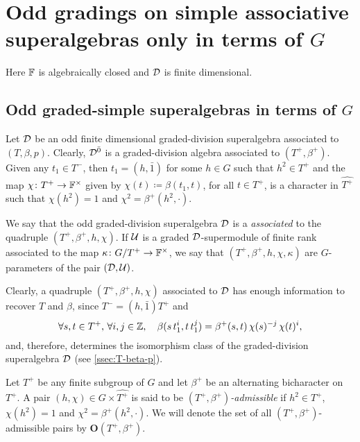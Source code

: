 \section{Odd gradings on simple associative superalgebras only in terms of \texorpdfstring{$G$}{G}}\label{sec:assc-only-G}

Here $\mathbb{F}$ is algebraically closed and $\mathcal{D}$ is finite dimensional.

\subsection{Odd graded-simple superalgebras in terms of $G$}\label{ssec:odd-div-G-only}

Let $\mathcal{D}$ be an odd finite dimensional graded-division superalgebra associated to $(T, \beta, p)$. 
Clearly, $\mathcal{D}^{\bar0}$ is a graded-division algebra associated to $(T^+, \beta^+)$. 
Given any $t_1 \in T^-$, then $t_1 = (h, \bar 1)$ for some $h\in G$ such that $h^2\in T^+$ and the map $\chi \colon T^+ \to \mathbb{F}^\times$ given by $\chi(t) \coloneqq \beta(t_1, t)$, for all $t\in T^+$, is a character in $\widehat{T^+}$ such that $\chi(h^2) = 1$ and $\chi^2 = \beta^+ (h^2, \cdot)$. 

\begin{defi}\label{def:O(T+-beta+)}
    We say that the odd graded-division superalgebra $\mathcal{D}$ is a \emph{associated} to the quadruple $(T^+, \beta^+, h,\chi)$. 
    If $\mathcal U$ is a graded $\mathcal{D}$-supermodule of finite rank associated to the map $\kappa\colon G/T^+ \to \mathbb{F}^\times$, we say that $(T^+, \beta^+, h, \chi, \kappa)$ are $G$-parameters of the pair $(\mathcal{D}, \mathcal U)$. 
\end{defi}

Clearly, a quadruple $(T^+, \beta^+, h,\chi)$ associated to $\mathcal{D}$ has enough information to recover $T$ and $\beta$, since $T^- = (h, \bar 1) T^+$ and
\[\label{eq:beta-from-h-chi}
    \forall s,t\in T^+,\, \forall i,j \in \mathbb{Z}, \quad \beta(s\, t_1^i,t \, t_1^j) = \beta^+(s,t)\, \chi (s)^{-j}\, \chi (t)^i,
\]
and, therefore, determines the isomorphism class of the graded-division superalgebra $\mathcal{D}$ (see \cref{ssec:T-beta-p}). 

\begin{defi}\label{def:odd-parameters}
    Let $T^+$ be any finite subgroup of $G$ and let $\beta^+$ be an alternating bicharacter on $T^+$. 
    A pair $(h,\chi) \in G \times \widehat{T^+}$ is said to be \emph{$(T^+, \beta^+)$-admissible} if 
    $h^2 \in T^+$, $\chi(h^2) = 1$ and $\chi^2 = \beta^+(h^2, \cdot)$. 
    We will denote the set of all $(T^+, \beta^+)$-admissible pairs by $\mathbf {O} (T^+, \beta^+)$. 
\end{defi}

